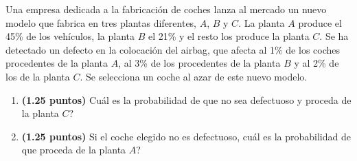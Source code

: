 
Una empresa dedicada a la fabricación de coches lanza al mercado un nuevo
modelo que fabrica en tres plantas diferentes, $A$, $B$ y $C$. La planta $A$
produce el 45\% de los vehículos, la planta $B$ el 21\% y el resto los produce
la planta $C$. Se ha detectado un defecto en la colocación del airbag, que
afecta al 1\% de los coches procedentes de la planta $A$, al 3\% de los
procedentes de la planta $B$ y al 2\% de los de la planta $C$. Se selecciona
un coche al azar de este nuevo modelo.
\begin{enumerate}[label=\alph*)]
  \item \textbf{(1.25 puntos)} \textquestiondown{}Cuál es la probabilidad
  de que no sea defectuoso y proceda de la planta $C$?
  \item \textbf{(1.25 puntos)} Si el coche elegido no es defectuoso,
  \textquestiondown{}cuál es la probabilidad de que proceda de la planta $A$?
\end{enumerate}
